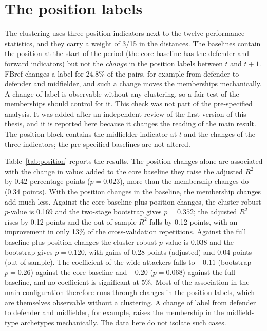 \section{The position labels}
\label{sec:results-position}

The clustering uses three position indicators next to the twelve performance statistics, and they carry a weight of 3/15 in the distances. The baselines contain the position at the start of the period (the core baseline has the defender and forward indicators) but not the \emph{change} in the position labels between $t$ and $t+1$. FBref changes a label for 24.8\% of the pairs, for example from defender to defender and midfielder, and such a change moves the memberships mechanically. A change of label is observable without any clustering, so a fair test of the memberships should control for it. This check was not part of the pre-specified analysis. It was added after an independent review of the first version of this thesis, and it is reported here because it changes the reading of the main result. The position block contains the midfielder indicator at $t$ and the changes of the three indicators; the pre-specified baselines are not altered.

Table~\ref{tab:position} reports the results. The position changes alone are associated with the change in value: added to the core baseline they raise the adjusted $R^2$ by 0.42 percentage points ($p=0.023$), more than the membership changes do (0.34 points). With the position changes in the baseline, the membership changes add much less. Against the core baseline plus position changes, the cluster-robust $p$-value is 0.169 and the two-stage bootstrap gives $p=0.352$; the adjusted $R^2$ rises by 0.12 points and the out-of-sample $R^2$ falls by 0.12 points, with an improvement in only 13\% of the cross-validation repetitions. Against the full baseline plus position changes the cluster-robust $p$-value is 0.038 and the bootstrap gives $p=0.120$, with gains of 0.28 points (adjusted) and 0.04 points (out of sample). The coefficient of the wide attackers falls to $-0.11$ (bootstrap $p=0.26$) against the core baseline and $-0.20$ ($p=0.068$) against the full baseline, and no coefficient is significant at 5\%. Most of the association in the main configuration therefore runs through changes in the position labels, which are themselves observable without a clustering. A change of label from defender to defender and midfielder, for example, raises the membership in the midfield-type archetypes mechanically. The data here do not isolate such cases.

